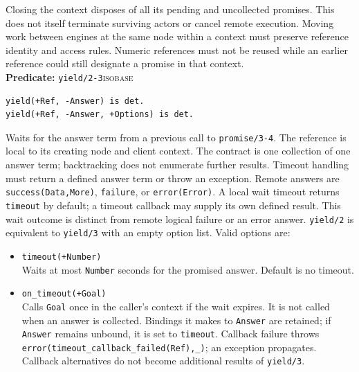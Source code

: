 Closing the context disposes of all its pending and uncollected promises.
This does not itself terminate surviving actors or cancel remote execution.
Moving work between engines at the same node within a context must preserve reference identity
and access rules. Numeric references must not be reused while an earlier
reference could still designate a promise in that context.\\

\noindent \textbf{Predicate:} \texttt{yield/\allowbreak{}2-3}\hfill\textsc{isobase}

\begin{verbatim}
yield(+Ref, -Answer) is det.
yield(+Ref, -Answer, +Options) is det.
\end{verbatim}

\noindent Waits for the answer term from a previous call to
\texttt{promise/\allowbreak{}3-4}. The reference is local to its creating
node and client context. The contract is one collection of one answer term; backtracking
does not enumerate further results. Timeout handling must return a defined
answer term or throw an exception.
Remote answers are \texttt{success(\allowbreak{}Data,\allowbreak{}More)}, \texttt{failure}, or
\texttt{error(\allowbreak{}Error)}. A local wait timeout returns \texttt{timeout} by
default; a timeout callback may supply its own defined result. This wait
outcome is distinct from remote logical failure or an error answer.
\texttt{yield/\allowbreak{}2} is equivalent to \texttt{yield/\allowbreak{}3} with an empty option list.
Valid options
are:

\begin{itemize}
\item
  \texttt{timeout(\allowbreak{}+Number)}\\
  Waits at most \texttt{Number} seconds for the promised answer. Default is no
  timeout.
\item
  \texttt{on\_\allowbreak{}timeout(\allowbreak{}+Goal)}\\
  Calls \texttt{Goal} once in the caller's context if the wait expires.
  It is not called when an answer is collected.
  Bindings it makes to \texttt{Answer} are retained; if \texttt{Answer}
  remains unbound, it is set to \texttt{timeout}. Callback failure throws
  \texttt{error(\allowbreak{}timeout\_\allowbreak{}callback\_\allowbreak{}failed(\allowbreak{}Ref),\allowbreak{}\_\allowbreak{})}; an exception propagates.
  Callback alternatives do not become additional results of \texttt{yield/\allowbreak{}3}.
\end{itemize}

